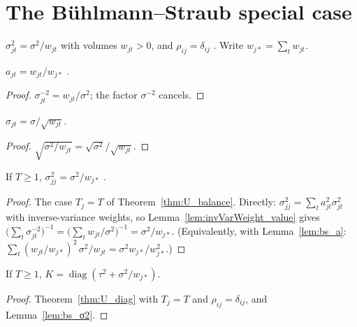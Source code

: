 \chapter{The Bühlmann--Straub special case}\label{ch:bs}

\begin{definition}\label{def:bsModel}
  \leanok
  $\sigma_{jt}^2 = \sigma^2/w_{jt}$ with volumes $w_{jt} > 0$, and
  $\rho_{ij} = \delta_{ij}$ . Write $w_{j*} = \sum_t w_{jt}$.
\end{definition}

\begin{lemma}\label{lem:bs_a}
  \leanok
  $a_{jt} = w_{jt}/w_{j*}$ .
\end{lemma}
\begin{proof}
  \leanok
  $\sigma_{jt}^{-2} = w_{jt}/\sigma^2$; the factor $\sigma^{-2}$ cancels.
\end{proof}

\begin{lemma}\label{lem:bs_σ_eq}
  \leanok
  $\sigma_{jt} = \sigma/\sqrt{w_{jt}}$.
\end{lemma}
\begin{proof}
  \leanok
  $\sqrt{\sigma^2/w_{jt}} = \sqrt{\sigma^2}/\sqrt{w_{jt}}$.
\end{proof}

\begin{lemma}\label{lem:bs_σ2}
  \leanok
  If $T \ge 1$, $\sigma_{jj}^2 = \sigma^2/w_{j*}$ .
\end{lemma}
\begin{proof}
  \leanok
  The case $T_j = T$ of Theorem~\ref{thm:U_balance}. Directly:
  $\sigma_{jj}^2 = \sum_t a_{jt}^2\sigma_{jt}^2$ with inverse-variance weights,
  so Lemma~\ref{lem:invVarWeight_value} gives
  $\bigl(\sum_t \sigma_{jt}^{-2}\bigr)^{-1} = \bigl(\sum_t w_{jt}/\sigma^2\bigr)^{-1}
  = \sigma^2/w_{j*}$. (Equivalently, with Lemma~\ref{lem:bs_a}:
  $\sum_t (w_{jt}/w_{j*})^2\,\sigma^2/w_{jt} = \sigma^2 w_{j*}/w_{j*}^2$.)
\end{proof}

\begin{lemma}[$K$ is diagonal]\label{lem:bs_K}
  \leanok
  If $T \ge 1$, $K = \operatorname{diag}(\tau^2 + \sigma^2/w_{j*})$.
\end{lemma}
\begin{proof}
  \leanok
  Theorem~\ref{thm:U_diag} with $T_j = T$ and $\rho_{ij} = \delta_{ij}$, and
  Lemma~\ref{lem:bs_σ2}.
\end{proof}

